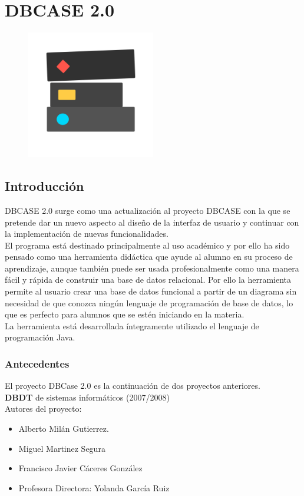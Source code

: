 \chapter{DBCASE 2.0}
\begin{figure}[H]
    \centering
    \includegraphics[width=0.5\textwidth]{img/DBCase_logo.png}
\end{figure}
\section{Introducción}
DBCASE 2.0 surge como una actualización al proyecto DBCASE con la que se pretende dar un nuevo aspecto al diseño de la interfaz de usuario y continuar con la implementación de nuevas funcionalidades.\\

El programa está destinado principalmente al uso académico y por ello ha sido pensado como una herramienta didáctica que ayude al alumno en su proceso de aprendizaje, aunque también puede ser usada profesionalmente como una manera fácil y rápida de construir una base de datos relacional. Por ello la herramienta permite al usuario crear una base de datos funcional a partir de un diagrama sin necesidad de que conozca ningún lenguaje de programación de base de datos, lo que es perfecto para alumnos que se estén iniciando en la materia.\\

La herramienta está desarrollada íntegramente utilizado el lenguaje de programación Java.

\subsection{Antecedentes}
El proyecto DBCase 2.0 es la continuación de dos proyectos anteriores.\\

\textbf{DBDT} de sistemas informáticos (2007/2008)\\
Autores del proyecto:
\begin{itemize}
    \item Alberto Milán Gutierrez.
    \item Miguel Martinez Segura
    \item Francisco Javier Cáceres González
    \item Profesora Directora: Yolanda García Ruiz
\end{itemize}

